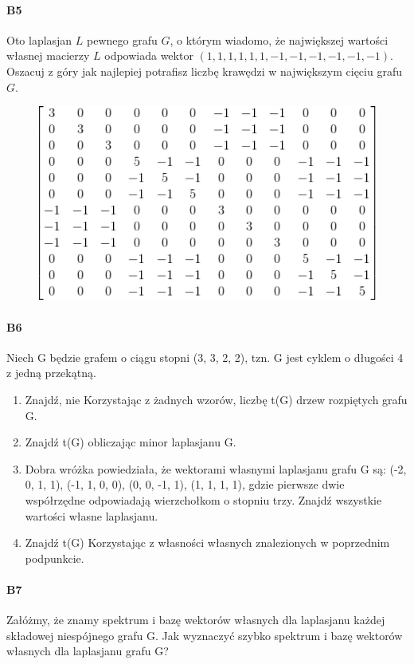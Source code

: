 \paragraph{B5} Oto laplasjan $L$ pewnego grafu $G$, o którym wiadomo, że największej wartości własnej macierzy $L$ odpowiada wektor $(1, 1, 1, 1, 1, 1, -1, -1, -1, -1, -1, -1)$. Oszacuj z góry jak najlepiej potrafisz liczbę krawędzi w największym cięciu grafu $G$.
\begin{figure}[H]
\centering
\includegraphics[width=.9\textwidth]{img/5_B5}
\end{figure}

\paragraph{B6} Niech G będzie grafem o ciągu stopni (3, 3, 2, 2), tzn. G jest cyklem o długości 4 z jedną przekątną.
\begin{enumerate}[label=\alph*)]
\item Znajdź, nie Korzystając z żadnych wzorów, liczbę t(G) drzew rozpiętych grafu G.
\item Znajdź t(G) obliczając minor laplasjanu G.
\item Dobra wróżka powiedziała, że wektorami własnymi laplasjanu grafu G są: (-2, 0, 1, 1), (-1, 1, 0, 0), (0, 0, -1, 1), (1, 1, 1, 1), gdzie pierwsze dwie współrzędne odpowiadają wierzchołkom o stopniu trzy. Znajdź wszystkie wartości własne laplasjanu.
\item Znajdź t(G) Korzystając z własności własnych znalezionych w poprzednim podpunkcie.
\end{enumerate}

\paragraph{B7} Załóżmy, że znamy spektrum i bazę wektorów własnych dla laplasjanu każdej składowej niespójnego grafu G. Jak wyznaczyć szybko spektrum i bazę wektorów własnych dla laplasjanu grafu G?

